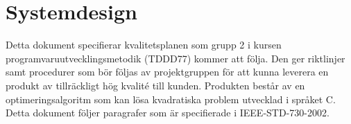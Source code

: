 \section{Systemdesign}
Detta dokument specifierar kvalitetsplanen som grupp 2 i kursen programvaruutvecklingsmetodik (TDDD77) kommer att följa. Den ger riktlinjer samt procedurer som bör följas av projektgruppen för att kunna leverera en produkt av tillräckligt hög kvalité till kunden. Produkten består av en optimeringsalgoritm som kan lösa kvadratiska problem utvecklad i språket C. Detta dokument följer paragrafer som är specifierade i IEEE-STD-730-2002.
